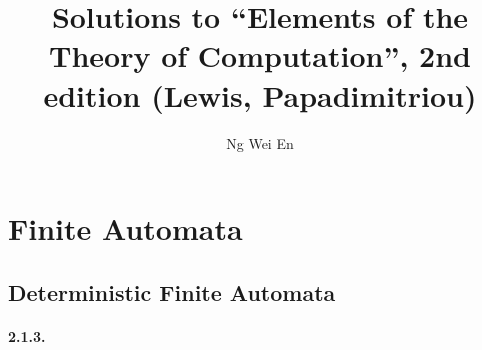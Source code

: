 \documentclass{article}
\title{Solutions to ``Elements of the Theory of Computation'', 2nd edition
(Lewis, Papadimitriou)}
\author{Ng Wei En}
\begin{document}
\maketitle
\tableofcontents
\newpage

\setcounter{section}{1}
\section{Finite Automata}

\subsection{Deterministic Finite Automata}

\paragraph{2.1.3.}
\end{document}

